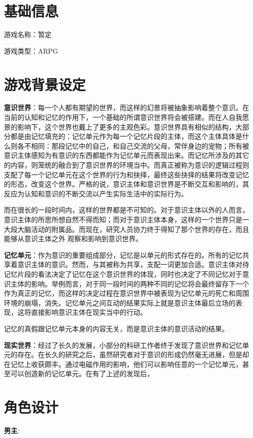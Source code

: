 \documentclass[12pt, a4paper]{article}
\begin{document}
    \section*{基础信息}
    游戏名称：暂定

    游戏类型：ARPG
    \newpage 

    \section*{游戏背景设定}
        
        \textbf{意识世界}：每一个人都有期望的世界，而这样的幻景将被抽象影响着整个意识。在当前的认知和记忆的作用下，一个基础的所谓意识世界将会被搭建。而在人自我愿景的影响下，这个世界也戴上了更多的主观色彩。意识世界具有相似的结构，大部分都是由记忆填充的：记忆单元作为每一个记忆片段的主体，而这个主体具体是什么则各不相同：那段记忆中的自己，和自己交流的父母，常伴身边的宠物；所有被意识主体感知为有意识的东西都能作为记忆单元而表现出来。而记忆所涉及的其它的内容，则笼统的融合到了意识世界的环境当中。而真正被称为意识的逻辑过程则支配了每一个记忆单元在这个世界的行为和抉择，最终这些抉择的结果将改变记忆的形态，改变这个世界。严格的说，意识主体和意识世界是不断交互和影响的，其反应为认知和意识的不断交流以产生实际生活中的实际行为。 
        
       而在很长的一段时间内，这样的世界都是不可知的。对于意识主体以外的人而言，意识主体的所思所想自然不得而知；而对于意识主体本身，这样的一个世界只是一大段大脑活动的附属品。而现在，研究人员协力终于得知了那个世界的存在，而且能够从意识主体之外
        观察和影响到意识世界。 

        \medskip
        \textbf{记忆单元}：作为意识的重要组成部分，记忆是以单元的形式存在的。所有的记忆共享着意识主体的意识。然而，与其被称为共享，支配一词更加合适。意识主体对待记忆片段的看法决定了记忆在这个意识世界的体现，同时也决定了不同记忆对于意识主体的影响。举例而言，对于同一段时间的两种不同的记忆将会最终留存下一个作为真正的记忆，而这样的决定过程在意识世界中被表现为记忆单元的死亡和周围环境的崩塌，消失。记忆单元之间互动的结果实际上就是意识主体最后立场的表现，这将直接影响意识主体在现实当中的行动。 

        记忆的真假跟记忆单元本身的内容无关，而是意识主体的意识活动的结果。

        \medskip
        \textbf{现实世界}：经过了长久的发展，小部分的科研工作者终于发现了意识世界和记忆单元的存在。在长久的研究之后，虽然研究者对于意识的形成仍然毫无进展，但是却在记忆上收获颇丰。通过电磁作用的影响，他们可以影响任意的一个记忆单元，甚至可以创造新的记忆单元。在有了上述的发现后，

    \newpage        
    \section*{角色设计}
        \textbf{男主}:

            
    \newpage 
    \section*{}
\end{document}
